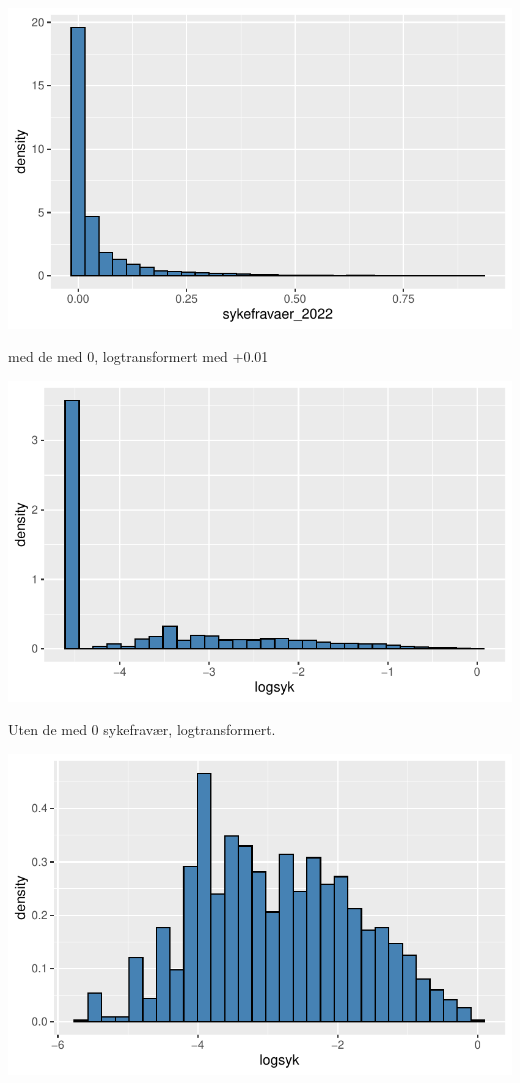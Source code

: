 \documentclass[
  12pt,
  a4paper,
  DIV=11,
  numbers=noendperiod]{scrartcl}
\begin{document}
\includegraphics{BACHELOR-SKRIVING-DANIEL-V2_files/figure-pdf/unnamed-chunk-9-1.pdf}

med de med 0, logtransformert med +0.01

\includegraphics{BACHELOR-SKRIVING-DANIEL-V2_files/figure-pdf/unnamed-chunk-10-1.pdf}

Uten de med 0 sykefravær, logtransformert.

\includegraphics{BACHELOR-SKRIVING-DANIEL-V2_files/figure-pdf/unnamed-chunk-11-1.pdf}
\end{document}
